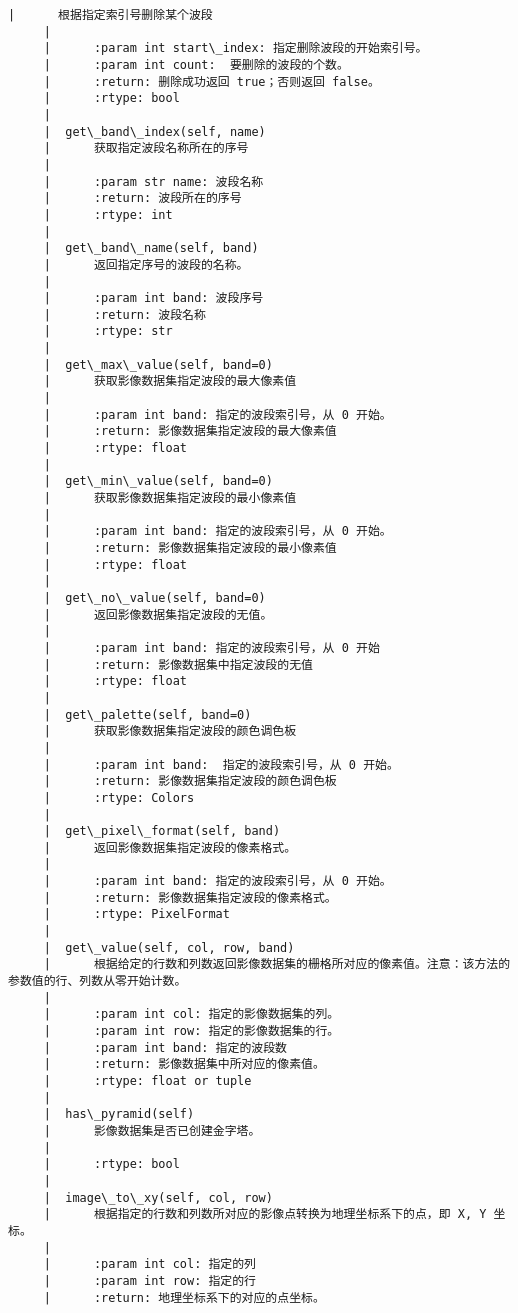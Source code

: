 \documentclass[11pt]{article}
\begin{document}
\begin{Verbatim}[commandchars=\\\{\}]
     |      根据指定索引号删除某个波段
     |      
     |      :param int start\_index: 指定删除波段的开始索引号。
     |      :param int count:  要删除的波段的个数。
     |      :return: 删除成功返回 true；否则返回 false。
     |      :rtype: bool
     |  
     |  get\_band\_index(self, name)
     |      获取指定波段名称所在的序号
     |      
     |      :param str name: 波段名称
     |      :return: 波段所在的序号
     |      :rtype: int
     |  
     |  get\_band\_name(self, band)
     |      返回指定序号的波段的名称。
     |      
     |      :param int band: 波段序号
     |      :return: 波段名称
     |      :rtype: str
     |  
     |  get\_max\_value(self, band=0)
     |      获取影像数据集指定波段的最大像素值
     |      
     |      :param int band: 指定的波段索引号，从 0 开始。
     |      :return: 影像数据集指定波段的最大像素值
     |      :rtype: float
     |  
     |  get\_min\_value(self, band=0)
     |      获取影像数据集指定波段的最小像素值
     |      
     |      :param int band: 指定的波段索引号，从 0 开始。
     |      :return: 影像数据集指定波段的最小像素值
     |      :rtype: float
     |  
     |  get\_no\_value(self, band=0)
     |      返回影像数据集指定波段的无值。
     |      
     |      :param int band: 指定的波段索引号，从 0 开始
     |      :return: 影像数据集中指定波段的无值
     |      :rtype: float
     |  
     |  get\_palette(self, band=0)
     |      获取影像数据集指定波段的颜色调色板
     |      
     |      :param int band:  指定的波段索引号，从 0 开始。
     |      :return: 影像数据集指定波段的颜色调色板
     |      :rtype: Colors
     |  
     |  get\_pixel\_format(self, band)
     |      返回影像数据集指定波段的像素格式。
     |      
     |      :param int band: 指定的波段索引号，从 0 开始。
     |      :return: 影像数据集指定波段的像素格式。
     |      :rtype: PixelFormat
     |  
     |  get\_value(self, col, row, band)
     |      根据给定的行数和列数返回影像数据集的栅格所对应的像素值。注意：该方法的参数值的行、列数从零开始计数。
     |      
     |      :param int col: 指定的影像数据集的列。
     |      :param int row: 指定的影像数据集的行。
     |      :param int band: 指定的波段数
     |      :return: 影像数据集中所对应的像素值。
     |      :rtype: float or tuple
     |  
     |  has\_pyramid(self)
     |      影像数据集是否已创建金字塔。
     |      
     |      :rtype: bool
     |  
     |  image\_to\_xy(self, col, row)
     |      根据指定的行数和列数所对应的影像点转换为地理坐标系下的点，即 X, Y 坐标。
     |      
     |      :param int col: 指定的列
     |      :param int row: 指定的行
     |      :return: 地理坐标系下的对应的点坐标。

\end{Verbatim}
\end{document}
